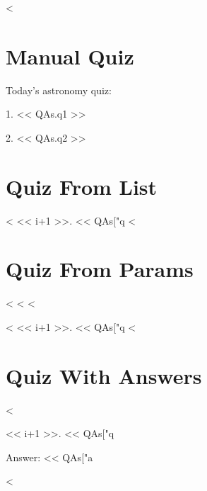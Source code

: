 \documentclass[11pt,a4paper]{article}
\begin{document}

<%

\section{Manual Quiz}

Today's astronomy quiz:

1. << QAs.q1 >>

2. << QAs.q2 >>


\section{Quiz From List}

<%
<< i+1 >>. << QAs["q%
<%

\section{Quiz From Params}

<%
<%
<%

<%
<< i+1 >>. << QAs["q%
<%

\section{Quiz With Answers}

<%

<< i+1 >>. << QAs["q%

Answer: << QAs["a%

<%
\end{document}
